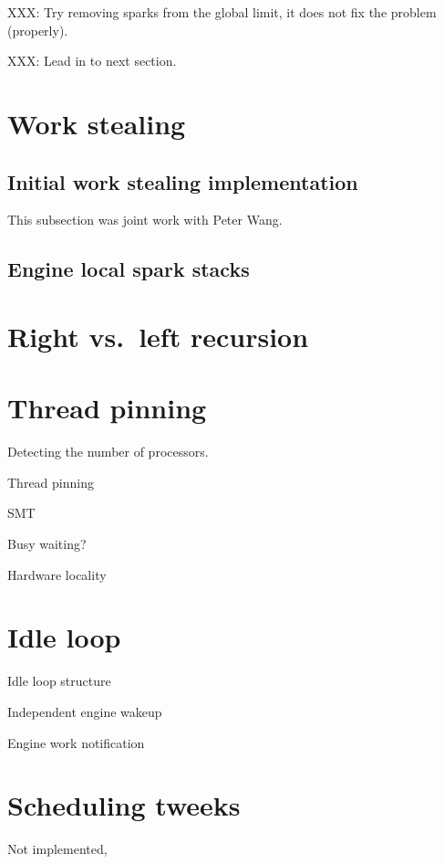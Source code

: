 XXX: Try removing sparks from the global limit,
it does not fix the problem (properly).

XXX: Lead in to next section.


\section{Work stealing}


\subsection{Initial work stealing implementation}

This subsection was joint work with Peter Wang.

\subsection{Engine local spark stacks}

\section{Right vs.\ left recursion}

\section{Thread pinning}

Detecting the number of processors.

Thread pinning

SMT

Busy waiting?

Hardware locality

\section{Idle loop}

Idle loop structure

Independent engine wakeup

Engine work notification

\section{Scheduling tweeks}

Not implemented,

